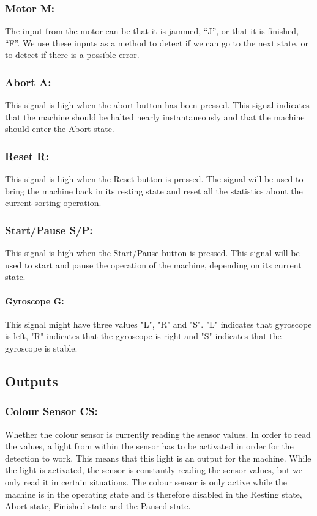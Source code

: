 \documentclass[a4paper,oneside,11pt]{article}
\begin{document}
\subsubsection{Motor M:} The input from the motor can be that it is jammed, “J”, or that it is finished, “F”. We use these inputs as a method to detect if we can go to the next state, or to detect if there is a possible error.
\subsubsection{Abort A:} This signal is high when the abort button has been pressed. This signal indicates that the machine should be halted nearly instantaneously and that the machine should enter the Abort state.
\subsubsection{Reset R:} This signal is high when the Reset button is pressed. The signal will be used to bring the machine back in its resting state and reset all the statistics about the current sorting operation.
\subsubsection{Start/Pause S/P:} This signal is high when the Start/Pause button is pressed. This signal will be used to start and pause the operation of the machine, depending on its current state.
\paragraph{Gyroscope G:} This signal might have three values "L", "R" and "S". "L" indicates that gyroscope is left, "R" indicates that the gyroscope is right and "S" indicates that the gyroscope is stable.

\subsection{Outputs}
\subsubsection{Colour Sensor CS:} Whether the colour sensor is currently reading the sensor values. In order to read the values, a light from within the sensor has to be activated in order for the detection to work. This means that this light is an output for the machine. While the light is activated, the sensor is constantly reading the sensor values, but we only read it in certain situations. The colour sensor is only active while the machine is in the operating state and is therefore disabled in the Resting state, Abort state, Finished state and the Paused state.
\end{document}

